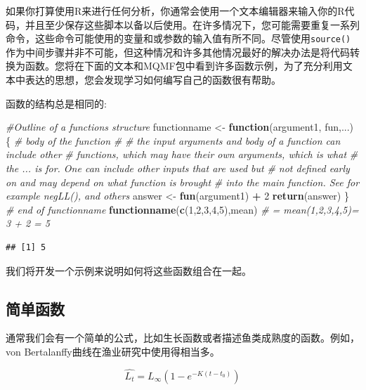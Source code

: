 \documentclass[
  lang=cn,
  11pt,
  scheme=chinese,
  chinesefont=nofont,
  citestyle=gb7714-2015,
  bibstyle=gb7714-2015]{elegantbook}
\newenvironment{Shaded}{\begin{snugshade}}{\end{snugshade}}
\newcommand{\CommentTok}[1]{\textcolor[rgb]{0.56,0.35,0.01}{\textit{#1}}}
\newcommand{\ControlFlowTok}[1]{\textcolor[rgb]{0.13,0.29,0.53}{\textbf{#1}}}
\newcommand{\DecValTok}[1]{\textcolor[rgb]{0.00,0.00,0.81}{#1}}
\newcommand{\FunctionTok}[1]{\textcolor[rgb]{0.13,0.29,0.53}{\textbf{#1}}}
\newcommand{\NormalTok}[1]{#1}
\newcommand{\OtherTok}[1]{\textcolor[rgb]{0.56,0.35,0.01}{#1}}
\newcommand{\SpecialCharTok}[1]{\textcolor[rgb]{0.81,0.36,0.00}{\textbf{#1}}}
\begin{document}
如果你打算使用R来进行任何分析，你通常会使用一个文本编辑器来输入你的R代码，并且至少保存这些脚本以备以后使用。在许多情况下，您可能需要重复一系列命令，这些命令可能使用的变量和或参数的输入值有所不同。尽管使用\texttt{source()}作为中间步骤并非不可能，但这种情况和许多其他情况最好的解决办法是将代码转换为函数。您将在下面的文本和MQMF包中看到许多函数示例，为了充分利用文本中表达的思想，您会发现学习如何编写自己的函数很有帮助。

函数的结构总是相同的:

\begin{Shaded}
\begin{Highlighting}[]
 \CommentTok{\#Outline of a function\textquotesingle{}s structure  }
\NormalTok{functionname }\OtherTok{\textless{}{-}} \ControlFlowTok{function}\NormalTok{(argument1, fun,...) \{  }
  \CommentTok{\# body of the function   }
  \CommentTok{\#   }
  \CommentTok{\# the input arguments and body of a function can include other  }
  \CommentTok{\# functions, which may have their own arguments, which is what  }
  \CommentTok{\# the ... is for. One can include other inputs that are used but  }
  \CommentTok{\# not defined early on and may depend on what function is brought  }
  \CommentTok{\# into the main function. See for example negLL(), and others   }
\NormalTok{  answer }\OtherTok{\textless{}{-}} \FunctionTok{fun}\NormalTok{(argument1) }\SpecialCharTok{+} \DecValTok{2}   
  \FunctionTok{return}\NormalTok{(answer)  }
\NormalTok{\} }\CommentTok{\# end of functionname  }
\FunctionTok{functionname}\NormalTok{(}\FunctionTok{c}\NormalTok{(}\DecValTok{1}\NormalTok{,}\DecValTok{2}\NormalTok{,}\DecValTok{3}\NormalTok{,}\DecValTok{4}\NormalTok{,}\DecValTok{5}\NormalTok{),mean)  }\CommentTok{\# = mean(1,2,3,4,5)= 3 + 2 = 5  }
\end{Highlighting}
\end{Shaded}

\begin{verbatim}
## [1] 5
\end{verbatim}

我们将开发一个示例来说明如何将这些函数组合在一起。

\subsection{简单函数}\label{ux7b80ux5355ux51fdux6570}

通常我们会有一个简单的公式，比如生长函数或者描述鱼类成熟度的函数。例如，von Bertalanffy曲线在渔业研究中使用得相当多。

\begin{equation}
\hat{L_t}=L_{\infty}{\left (1-e^{-K(t-t_0)} \right )}  
\label{eq:lab1}
\end{equation}
\end{document}
